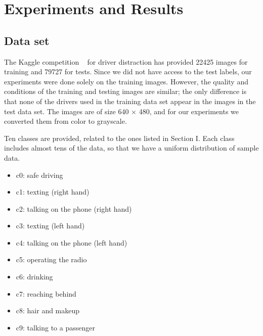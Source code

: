 \documentclass{article}
\begin{document}
\section{Experiments and Results}


\subsection{Data set} The Kaggle competition \unskip~\cite{1641075:26775858} for driver distraction has provided 22425 images for training and 79727 for tests. Since we did not have access to the test labels, our experiments were done solely on the training images. However, the quality and conditions of the training and testing images are similar; the only difference is that none of the drivers used in the training data set appear in the images in the test data set. The images are of size 640 \ensuremath{\times} 480, and for our experiments we converted them from color to grayscale.

Ten classes are provided, related to the ones listed in Section I. Each class includes almost tens of the data, so that we have a uniform distribution of sample data.

\begin{itemize}
  \item \relax c0: safe driving
  \item \relax c1: texting (right hand)
  \item \relax c2: talking on the phone (right hand)
  \item \relax c3: texting (left hand)
  \item \relax c4: talking on the phone (left hand)
  \item \relax c5: operating the radio
  \item \relax c6: drinking
  \item \relax c7: reaching behind
  \item \relax c8: hair and makeup
  \item \relax c9: talking to a passenger
\end{itemize}
\end{document}
